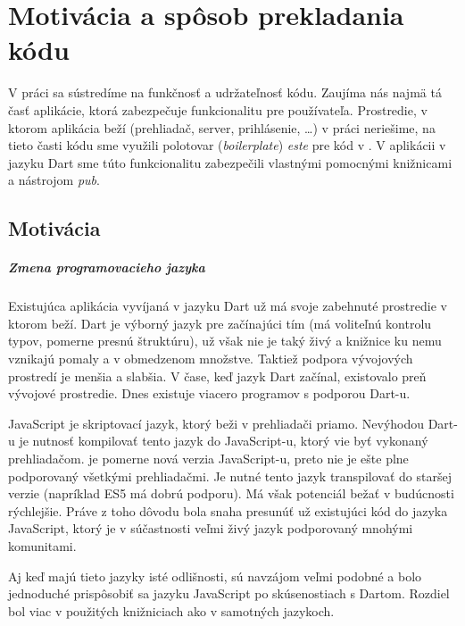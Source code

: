 \chapter{Motivácia a spôsob prekladania kódu}%

\label{kap:motivacia} %

V práci sa sústredíme na funkčnosť a udržateľnosť kódu. Zaujíma nás najmä tá časť aplikácie, ktorá zabezpečuje funkcionalitu pre používateľa. Prostredie, v ktorom aplikácia beží (prehliadač, server, prihlásenie, \ldots) v práci neriešime, na tieto časti kódu sme využili polotovar (\emph{boilerplate})
\emph{este} \cite{Este} pre kód v \JS{}. 
V aplikácii v jazyku Dart sme túto funkcionalitu zabezpečili vlastnými pomocnými knižnicami a nástrojom \emph{pub}.

\section{Motivácia}
\paragraph{Zmena programovacieho jazyka}
Existujúca aplikácia vyvíjaná v jazyku Dart už má svoje zabehnuté prostredie v ktorom beží. Dart je výborný jazyk pre začínajúci tím (má voliteľnú kontrolu typov, pomerne presnú štruktúru), už však nie je taký živý a knižnice ku nemu vznikajú pomaly a v obmedzenom množstve. 
Taktiež podpora vývojových prostredí je menšia a slabšia. V čase, keď jazyk Dart začínal, existovalo preň vývojové prostredie. Dnes existuje viacero programov s podporou Dart-u. 

JavaScript je skriptovací jazyk, ktorý beži v prehliadači priamo. Nevýhodou Dart-u je nutnosť kompilovať tento jazyk do JavaScript-u, ktorý vie byť vykonaný prehliadačom. \JS{} je pomerne nová verzia JavaScript-u, preto nie je ešte plne podporovaný všetkými prehliadačmi. Je nutné tento jazyk transpilovať do staršej verzie (napríklad ES5 má dobrú podporu). Má však potenciál bežať v budúcnosti rýchlejšie.
Práve z toho dôvodu bola snaha presunúť už existujúci kód do jazyka JavaScript, ktorý je v súčastnosti veľmi živý jazyk podporovaný mnohými komunitami. 

Aj keď majú tieto jazyky isté odlišnosti, sú navzájom veľmi podobné a bolo jednoduché prispôsobiť sa jazyku JavaScript po skúsenostiach s Dartom.
Rozdiel bol viac v použitých knižniciach ako v samotných jazykoch.

